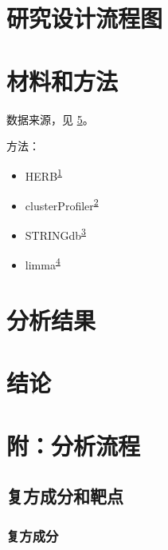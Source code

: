 \documentclass[
]{article}
\providecommand{\tightlist}{%
  \setlength{\itemsep}{0pt}\setlength{\parskip}{0pt}}
\begin{document}
\hypertarget{route}{%
\section{研究设计流程图}\label{route}}

\hypertarget{methods}{%
\section{材料和方法}\label{methods}}

数据来源，见 \ref{workflow}。

方法：

\begin{itemize}
\tightlist
\item
  HERB\textsuperscript{\protect\hyperlink{ref-HerbAHighThFang2021}{1}}
\item
  clusterProfiler\textsuperscript{\protect\hyperlink{ref-ClusterprofilerWuTi2021}{2}}
\item
  STRINGdb\textsuperscript{\protect\hyperlink{ref-TheStringDataSzklar2021}{3}}
\item
  limma\textsuperscript{\protect\hyperlink{ref-LimmaPowersDiRitchi2015}{4}}
\end{itemize}

\hypertarget{results}{%
\section{分析结果}\label{results}}

\hypertarget{dis}{%
\section{结论}\label{dis}}

\hypertarget{workflow}{%
\section{附：分析流程}\label{workflow}}

\hypertarget{ux590dux65b9ux6210ux5206ux548cux9776ux70b9}{%
\subsection{复方成分和靶点}\label{ux590dux65b9ux6210ux5206ux548cux9776ux70b9}}

\hypertarget{ux590dux65b9ux6210ux5206}{%
\subsubsection{复方成分}\label{ux590dux65b9ux6210ux5206}}
\end{document}
